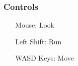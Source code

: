 


\subsubsection{Controls}
\begin{center}
    \begin{minipage}{0.5\textwidth}
        \begin{itemize}
            \item[Mouse:] Look
            \item[Left Shift:] Run
            \item[WASD Keys:] Move
        \end{itemize}
    \end{minipage}
\end{center}


